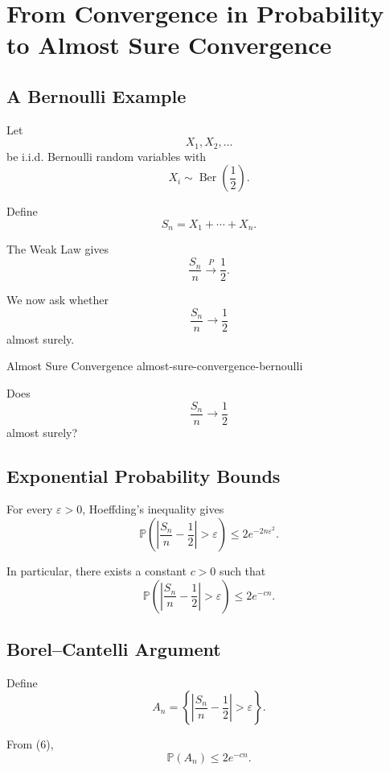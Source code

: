 
\section{From Convergence in Probability to Almost Sure Convergence}

\subsection{A Bernoulli Example}

Let
\[
X_1,X_2,\ldots
\]
be i.i.d. Bernoulli random variables with
\[
X_i\sim\operatorname{Ber}\left(\frac12\right).
\]

Define
\[
S_n=X_1+\cdots+X_n.
\]

The Weak Law gives
\[
\frac{S_n}{n}
\xrightarrow{P}
\frac12.
\]

We now ask whether
\[
\frac{S_n}{n}
\longrightarrow
\frac12
\]
almost surely.

\begin{question}{Almost Sure Convergence}
{almost-sure-convergence-bernoulli}

Does
\[
\frac{S_n}{n}
\longrightarrow
\frac12
\]
almost surely?

\end{question}


\subsection{Exponential Probability Bounds}

For every $\varepsilon>0$, Hoeffding's inequality gives
\[
\mathbb{P}
\left(
\left|
\frac{S_n}{n}-\frac12
\right|
>\varepsilon
\right)
\leq
2e^{-2n\varepsilon^2}.
\]

In particular, there exists a constant $c>0$ such that
\[
\boxed{
\mathbb{P}
\left(
\left|
\frac{S_n}{n}-\frac12
\right|
>\varepsilon
\right)
\leq
2e^{-cn}.
}
\tag{6}
\]

\subsection{Borel--Cantelli Argument}

Define
\[
A_n
=
\left\{
\left|
\frac{S_n}{n}-\frac12
\right|
>\varepsilon
\right\}.
\]

From (6),
\[
\mathbb{P}(A_n)
\leq
2e^{-cn}.
\]

